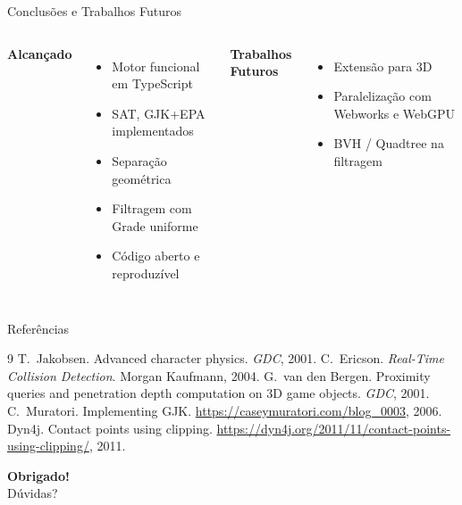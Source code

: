 \documentclass[12pt]{beamer}
\begin{document}
\begin{frame}{Conclusões e Trabalhos Futuros}
  \begin{columns}[T]
      \textbf{Alcançado}
      \begin{itemize}
        \item Motor funcional em TypeScript
        \item SAT, GJK+EPA implementados
        \item Separação geométrica
        \item Filtragem com Grade uniforme
        \item Código aberto e reproduzível
      \end{itemize}
      \textbf{Trabalhos Futuros}
      \begin{itemize}
        \item Extensão para 3D
        \item Paralelização com Webworks e WebGPU
        \item BVH / Quadtree na filtragem
      \end{itemize}
  \end{columns}
\end{frame}

\begin{frame}{Referências}
  \footnotesize
  \begin{thebibliography}{9}
      T.~Jakobsen.
      Advanced character physics.
      \textit{GDC}, 2001.
      C.~Ericson.
      \textit{Real-Time Collision Detection}.
      Morgan Kaufmann, 2004.
      G.~van den Bergen.
      Proximity queries and penetration depth computation on 3D game objects.
      \textit{GDC}, 2001.
      C.~Muratori.
      Implementing GJK.
      \url{https://caseymuratori.com/blog_0003}, 2006.
      Dyn4j.
      Contact points using clipping.
      \url{https://dyn4j.org/2011/11/contact-points-using-clipping/}, 2011.
  \end{thebibliography}
\end{frame}

\begin{frame}[plain]
  \vfill
  \begin{center}
    {\Large\textbf{Obrigado!}}\\[0.8cm]
    Dúvidas?\\[0.4cm]
    \begin{figure}
      
    \end{figure}
  \end{center}
  \vfill
\end{frame}
\end{document}
